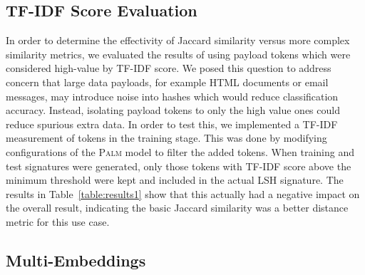 \subsection{TF-IDF Score Evaluation}
In order to determine the effectivity of Jaccard similarity versus more complex similarity metrics, we evaluated the results of using payload tokens which were considered high-value by TF-IDF score. We posed this question to address concern that large data payloads, for example HTML documents or email messages, may introduce noise into hashes which would reduce classification accuracy. Instead, isolating payload tokens to only the high value ones could reduce spurious extra data. In order to test this, we implemented a TF-IDF measurement of tokens in the training stage. This was done by modifying configurations of the \textsc{Palm} model to filter the added tokens. When training and test signatures were generated, only those tokens with TF-IDF score above the minimum threshold were kept and included in the actual LSH signature. The results in Table~\ref{table:results1} show that this actually had a negative impact on the overall result, indicating the basic Jaccard similarity was a better distance metric for this use case.

\subsection{Multi-Embeddings}

